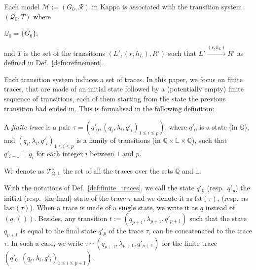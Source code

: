 \documentclass[10pt,a4paper]{llncs}
\newcommand{\bydef}{\stackrel{\scalebox{0.8}{\!\!$\scriptscriptstyle{\triangle}$}}{=}}
\renewcommand{\bydef}{:=}
\newcommand{\graphsymb}{G}
\newcommand{\states}{\mathbb{Q}}
\newcommand{\labels}{\mathbb{L}}
\newcommand{\init}[1][\tau]{\textrm{fst}(#1)}
\newcommand{\final}[1][\tau]{\textrm{last}(#1)}
\newcommand{\compose}{\smallfrown}
\newcommand{\traces}[1][\states,\labels]{\mathcal{T}^{\star}_{#1}}
\begin{document}
Each model $\mathcal{M}\bydef(\graphsymb_0,\mathcal{R})$ in Kappa is associated with the transition system $(\mathcal{Q}_0,T)$
where \begin{inparaenum}\item $\mathcal{Q}_0=\{\graphsymb_0\}$; \item and $T$ is the set of the transitions $(L',(r,h_L),R')$ such that
$L' \xrightarrow{(r,h_L)} R'$ as defined in Def.~\ref{defn:refinement}.
\end{inparaenum}

Each transition system induces a set of traces. In this paper, we focus on finite traces, that are made of an initial state followed by a (potentially empty) finite sequence of transitions, each of them starting from the state the previous transition had ended in. This is formalised in the following definition:
\begin{definition}%
\label{def:finite_traces}
A \emph{finite trace} is a pair $\tau=(q'_0,(q_i,\lambda_i,q'_i)_{1\leq i \leq p})$, where $q'_0$ is a state (in $\states$), and $(q_i,\lambda_i,q'_i)_{1\leq i \leq p}$ is a family of transitions (in $\states\times\labels\times\states$),  such that $q'_{i-1}=q_i$ for each integer   $i$ between $1$ and $p$.
\end{definition}

We denote as $\traces$ the set of all the traces over the sets $\states$ and $\labels$.

With the notations of Def.~\ref{def:finite_traces}, we call the state $q'_0$ (resp.~$q'_p$) the initial (resp.~the final) state of the trace $\tau$ and we denote it as $\init$,  (resp.~as $\final$). When a trace is made of a single  state, we write it as $q$ instead of $(q,())$.
Besides, any transition $t\bydef(q_{p+1},\lambda_{p+1},q'_{p+1})$ such that the state $q_{p+1}$ is equal to the final state $q'_{p}$ of the trace $\tau$, can be concatenated to the trace $\tau$. In such a case, we write
$\tau \compose (q_{p+1},\lambda_{p+1},q'_{p+1})$ for the finite trace $(q'_0,(q_i,\lambda_i,q'_i)_{1\leq i \leq p+1})$.
\end{document}
